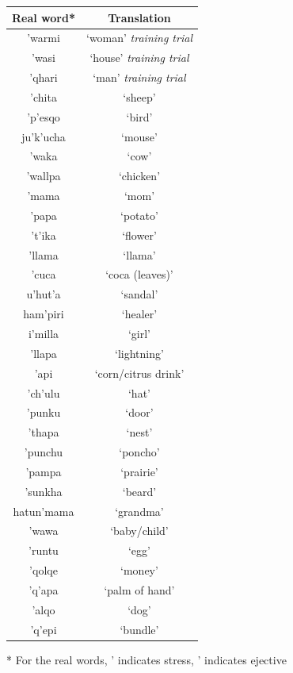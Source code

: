 \documentclass[a4paper,man,floatsintext,natbib,donotrepeattitle, apacite]{apa6}
\begin{document}
\begin{table}

\centering
\begin{tabular}{c | c} 
\hline
Real word* & Translation  \\
\hline

\footnotesize{\textsf{'}warmi} & `woman' \textit{training trial}\\
\footnotesize{\textsf{'}wasi} & `house' \textit{training trial} \\
\footnotesize{\textsf{'}qhari} & `man' \textit{training trial}\\
\footnotesize{\textsf{'}chita} & `sheep' \\
\footnotesize{\textsf{'}p'esqo} & `bird' \\
\footnotesize{ju\textsf{'}k'ucha} & `mouse' \\
\footnotesize{\textsf{'}waka} & `cow' \\
\footnotesize{\textsf{'}wallpa} & `chicken' \\
\footnotesize{\textsf{'}mama} & `mom' \\
\footnotesize{\textsf{'}papa} & `potato' \\
\footnotesize{\textsf{'}t'ika} & `flower' \\
\footnotesize{\textsf{'}llama} & `llama' \\
\footnotesize{\textsf{'}cuca} & `coca (leaves)' \\
\footnotesize{u\textsf{'}hut'a} & `sandal' \\
\footnotesize{ham\textsf{'}piri} & `healer' \\
\footnotesize{i\textsf{'}milla} & `girl' \\
\footnotesize{\textsf{'}llapa} & `lightning' \\
\footnotesize{\textsf{'}api} & `corn/citrus drink' \\
\footnotesize{\textsf{'}ch'ulu} & `hat' \\
\footnotesize{\textsf{'}punku} & `door' \\
\footnotesize{\textsf{'}thapa} & `nest' \\
\footnotesize{\textsf{'}punchu} & `poncho' \\
\footnotesize{\textsf{'}pampa} & `prairie' \\
\footnotesize{\textsf{'}sunkha} & `beard' \\
\footnotesize{hatun\textsf{'}mama} & `grandma' \\
\footnotesize{\textsf{'}wawa} & `baby/child' \\
\footnotesize{\textsf{'}runtu} & `egg' \\
\footnotesize{\textsf{'}qolqe} & `money' \\
\footnotesize{\textsf{'}q'apa} & `palm of hand' \\
\footnotesize{\textsf{'}alqo} & `dog' \\
\footnotesize{\textsf{'}q'epi} & `bundle' \\
 \hline

\end{tabular}\par
\smallskip
* For the real words, \textsf{'} indicates stress, ' indicates ejective
\end{table}
\end{document}
